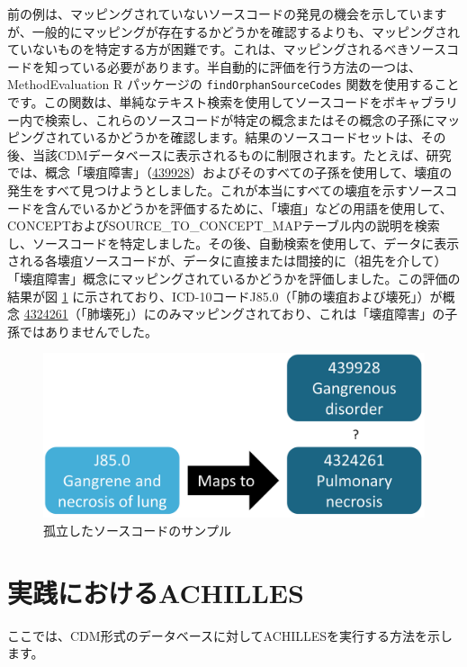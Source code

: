 \documentclass[
  11pt]{book}
\theoremstyle{definition}
\theoremstyle{definition}
\theoremstyle{definition}
\theoremstyle{definition}
\theoremstyle{remark}
\begin{document}
前の例は、マッピングされていないソースコードの発見の機会を示していますが、一般的にマッピングが存在するかどうかを確認するよりも、マッピングされていないものを特定する方が困難です。これは、マッピングされるべきソースコードを知っている必要があります。半自動的に評価を行う方法の一つは、MethodEvaluation R パッケージの \texttt{findOrphanSourceCodes} 関数を使用することです。この関数は、単純なテキスト検索を使用してソースコードをボキャブラリー内で検索し、これらのソースコードが特定の概念またはその概念の子孫にマッピングされているかどうかを確認します。結果のソースコードセットは、その後、当該CDMデータベースに表示されるものに制限されます。たとえば、研究では、概念「壊疽障害」（\href{http://athena.ohdsi.org/search-terms/terms/439928}{439928}）およびそのすべての子孫を使用して、壊疽の発生をすべて見つけようとしました。これが本当にすべての壊疽を示すソースコードを含んでいるかどうかを評価するために、「壊疽」などの用語を使用して、CONCEPTおよびSOURCE\_TO\_CONCEPT\_MAPテーブル内の説明を検索し、ソースコードを特定しました。その後、自動検索を使用して、データに表示される各壊疽ソースコードが、データに直接または間接的に（祖先を介して）「壊疽障害」概念にマッピングされているかどうかを評価しました。この評価の結果が図 \ref{fig:missingMapping} に示されており、ICD-10コードJ85.0（「肺の壊疽および壊死」）が概念 \href{http://athena.ohdsi.org/search-terms/terms/4324261}{4324261}（「肺壊死」）にのみマッピングされており、これは「壊疽障害」の子孫ではありませんでした。

\begin{figure}

{\centering \includegraphics[width=0.7\linewidth]{images/DataQuality/missingMapping} 

}

\caption{孤立したソースコードのサンプル}\label{fig:missingMapping}
\end{figure}

\section{実践におけるACHILLES}\label{achillesInPractice}

ここでは、CDM形式のデータベースに対してACHILLESを実行する方法を示します。
\end{document}
